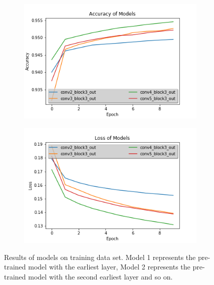 \documentclass{article}
\begin{document}
\begin{figure}[ht]
    \centering
    \begin{subfigure}[b]{0.8\linewidth}
      \includegraphics[width=\linewidth]{paper/figures/accuray.png}
    \end{subfigure}
    
    \begin{subfigure}[b]{0.8\linewidth}
      \includegraphics[width=\linewidth]{paper/figures/loss.png}
    \end{subfigure}
    \caption{Results of models on training data set. Model 1 represents the pre-trained model with the earliest layer, Model 2 represents the pre-trained model with the second earliest layer and so on.}
  \end{figure}
\end{document}
